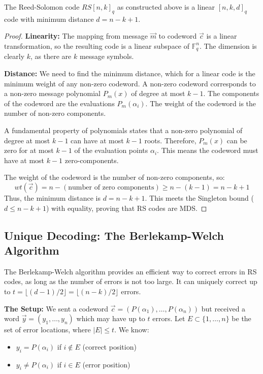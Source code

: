\begin{theorem}
The Reed-Solomon code $RS[n, k]_q$ as constructed above is a linear $[n, k, d]_q$ code with minimum distance $d = n - k + 1$.
\end{theorem}
\begin{proof}
\textbf{Linearity:} The mapping from message $\vec{m}$ to codeword $\vec{c}$ is a linear transformation, so the resulting code is a linear subspace of $\mathbb{F}_q^n$. The dimension is clearly $k$, as there are $k$ message symbols.

\textbf{Distance:} We need to find the minimum distance, which for a linear code is the minimum weight of any non-zero codeword. A non-zero codeword corresponds to a non-zero message polynomial $P_m(x)$ of degree at most $k-1$. The components of the codeword are the evaluations $P_m(\alpha_i)$. The weight of the codeword is the number of non-zero components.

A fundamental property of polynomials states that a non-zero polynomial of degree at most $k-1$ can have at most $k-1$ roots. Therefore, $P_m(x)$ can be zero for at most $k-1$ of the evaluation points $\alpha_i$. This means the codeword must have at most $k-1$ zero-components.

The weight of the codeword is the number of non-zero components, so:
\[ wt(\vec{c}) = n - (\text{number of zero components}) \ge n - (k-1) = n - k + 1 \]
Thus, the minimum distance is $d = n - k + 1$. This meets the Singleton bound ($d \le n-k+1$) with equality, proving that RS codes are MDS.
\end{proof}

\subsection{Unique Decoding: The Berlekamp-Welch Algorithm}

The Berlekamp-Welch algorithm provides an efficient way to correct errors in RS codes, as long as the number of errors is not too large. It can uniquely correct up to $t = \lfloor (d-1)/2 \rfloor = \lfloor (n-k)/2 \rfloor$ errors.

\textbf{The Setup:} We sent a codeword $\vec{c} = (P(\alpha_1), \dots, P(\alpha_n))$ but received a word $\vec{y} = (y_1, \dots, y_n)$ which may have up to $t$ errors. Let $E \subset \{1, \dots, n\}$ be the set of error locations, where $|E| \le t$.
We know:
\begin{itemize}
    \item $y_i = P(\alpha_i)$ if $i \notin E$ (correct position)
    \item $y_i \neq P(\alpha_i)$ if $i \in E$ (error position)
\end{itemize}

